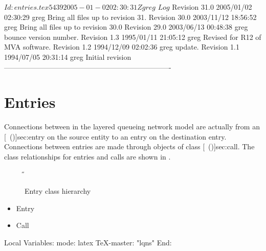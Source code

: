 \C 
\C $Id: entries.tex 5439 2005-01-02 02:30:31Z greg $
\C 
\C $Log$
\C Revision 31.0  2005/01/02 02:30:29  greg
\C Bring all files up to revision 31.
\C
\C Revision 30.0  2003/11/12 18:56:52  greg
\C Bring all files up to revision 30.0
\C
\C Revision 29.0  2003/06/13 00:48:38  greg
\C bounce version number.
\C
\C Revision 1.3  1995/01/11 21:05:12  greg
\C Revised for R12 of MVA software.
\C
\C Revision 1.2  1994/12/09  02:02:36  greg
\C update.
\C
\C Revision 1.1  1994/07/05  20:31:14  greg
\C Initial revision
\C
\C ----------------------------------------------------------------------
\chapter{Entries}
\label{sec:entries}

Connections between  in the layered
queueing network model are actually from an
[~(\Sec\Ref)]{sec:entry} on the source entity to an
entry on the destination entry.  Connections between entries are made
through objects of class [~(\Sec\Ref)]{sec:call}.
The class relationships for entries and calls are shown in
.

\begin{figure}[htbp]
  \label{fig:entry}
  \begin{center}
    \T \tex \leavevmode 
    \caption{Entry class hierarchy}
    \H {}
  \end{center}
\end{figure}

\begin{iftex}
\begin{itemize}
\item Entry
\item Call
\end{itemize}
\end{iftex}



\C Local Variables: 
\C mode: latex
\C TeX-master: "lqns"
\C End: 
